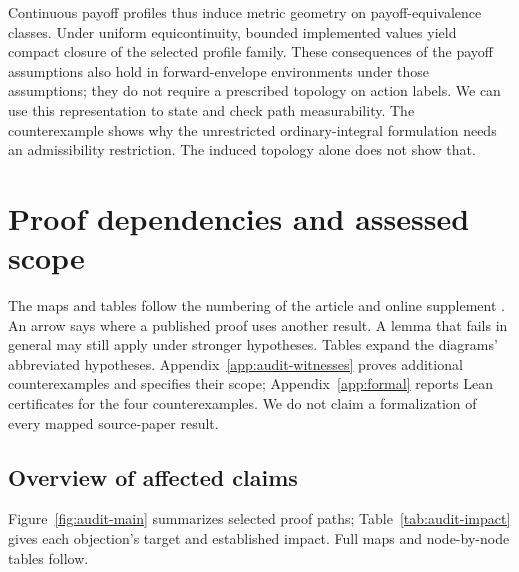 \documentclass[11pt]{article}
\theoremstyle{remark}\newtheorem{remark}[theorem]{Remark}
\begin{document}
Continuous payoff profiles thus induce metric geometry on payoff-equivalence classes. Under uniform equicontinuity, bounded implemented values yield compact closure of the selected profile family. These consequences of the payoff assumptions also hold in forward-envelope environments under those assumptions; they do not require a prescribed topology on action labels. We can use this representation to state and check path measurability. The counterexample shows why the unrestricted ordinary-integral formulation needs an admissibility restriction. The induced topology alone does not show that.


\FloatBarrier
\section{Proof dependencies and assessed scope}\label{app:dependency}
The maps and tables follow the numbering of the article \citep{Sinander2022} and online supplement \citep{Sinander2022supp}. An arrow says where a published proof uses another result. A lemma that fails in general may still apply under stronger hypotheses. Tables expand the diagrams' abbreviated hypotheses. Appendix~\ref{app:audit-witnesses} proves additional counterexamples and specifies their scope; Appendix~\ref{app:formal} reports Lean certificates for the four counterexamples. We do not claim a formalization of every mapped source-paper result.


\subsection{Overview of affected claims}\label{app:audit-overview}
Figure~\ref{fig:audit-main} summarizes selected proof paths;
Table~\ref{tab:audit-impact} gives each objection's target and established
impact. Full maps and node-by-node tables follow.
\end{document}
